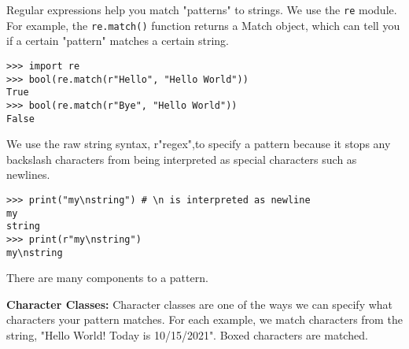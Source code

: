 Regular expressions help you match "patterns" to strings. We use the \lstinline{re} module.
For example, the \lstinline{re.match()} function returns a Match object, which can tell you if a certain "pattern" matches a certain string.

\begin{lstlisting}
>>> import re
>>> bool(re.match(r"Hello", "Hello World"))
True
>>> bool(re.match(r"Bye", "Hello World"))
False
\end{lstlisting}

We use the raw string syntax, r"regex",to specify a pattern because
it stops any backslash characters from being interpreted as special characters such as newlines.

\begin{lstlisting}
>>> print("my\nstring") # \n is interpreted as newline
my
string
>>> print(r"my\nstring")
my\nstring
\end{lstlisting}

There are many components to a pattern.

\textbf{Character Classes:}
Character classes are one of the ways we can specify what characters your pattern matches.
For each example, we match characters from the string, "Hello World! Today is 10/15/2021".
Boxed characters are matched.

